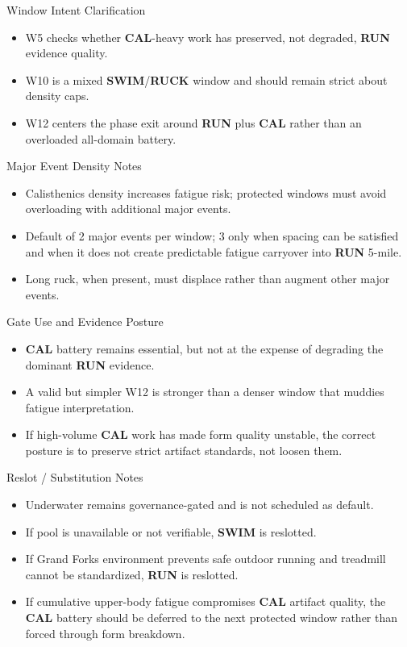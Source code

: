 \documentclass[10pt]{article}
\begin{document}
Window Intent Clarification

\begin{itemize}
\item W5 checks whether \textbf{CAL}-heavy work has preserved, not degraded, \textbf{RUN} evidence quality.
\item W10 is a mixed \textbf{SWIM}/\textbf{RUCK} window and should remain strict about density caps.
\item W12 centers the phase exit around \textbf{RUN} plus \textbf{CAL} rather than an overloaded all-domain battery.
\end{itemize}

Major Event Density Notes

\begin{itemize}
\item Calisthenics density increases fatigue risk; protected windows must avoid overloading with additional major events.
\item Default of 2 major events per window; 3 only when spacing can be satisfied and when it does not create predictable fatigue carryover into \textbf{RUN} 5-mile.
\item Long ruck, when present, must displace rather than augment other major events.
\end{itemize}

Gate Use and Evidence Posture

\begin{itemize}
\item \textbf{CAL} battery remains essential, but not at the expense of degrading the dominant \textbf{RUN} evidence.
\item A valid but simpler W12 is stronger than a denser window that muddies fatigue interpretation.
\item If high-volume \textbf{CAL} work has made form quality unstable, the correct posture is to preserve strict artifact standards, not loosen them.
\end{itemize}

Reslot / Substitution Notes

\begin{itemize}
\item Underwater remains governance-gated and is not scheduled as default.
\item If pool is unavailable or not verifiable, \textbf{SWIM} is reslotted.
\item If Grand Forks environment prevents safe outdoor running and treadmill cannot be standardized, \textbf{RUN} is reslotted.
\item If cumulative upper-body fatigue compromises \textbf{CAL} artifact quality, the \textbf{CAL} battery should be deferred to the next protected window rather than forced through form breakdown.
\end{itemize}
\end{document}

